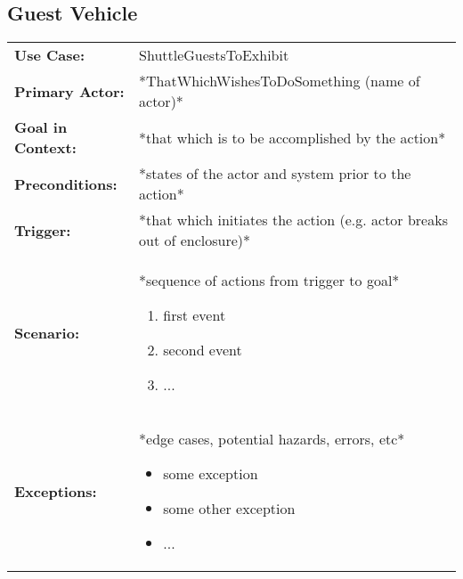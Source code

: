 \documentclass[12pt]{article}
\begin{document}
    \subsection{Guest Vehicle}
    \begin{table}[H]
    \begin{tabular}{lp{9.9cm}}
        \hline
        \textbf{Use Case:}                     & ShuttleGuestsToExhibit \\

        \textbf{Primary Actor:}                & *ThatWhichWishesToDoSomething (name of actor)*\\

        \textbf{Goal in Context:}              & *that which is to be accomplished by the action* \\

        \textbf{Preconditions:}                & *states of the actor and system prior to the action* \\

        \textbf{Trigger:}                      & *that which initiates the action (e.g. actor breaks out of enclosure)*\\

        \textbf{Scenario:}                     & *sequence of actions from trigger to goal*
                                                 \begin{enumerate}
                                                     \item first event
                                                     \item second event
                                                     \item ...
                                                 \end{enumerate} \\

        \textbf{Exceptions:}                   & *edge cases, potential hazards, errors, etc*
                                                 \begin{itemize}
                                                     \item[] some exception
                                                     \item[] some other exception
                                                     \item[] ...
                                                 \end{itemize}\\


\end{tabular}
\end{table}
\end{document}
